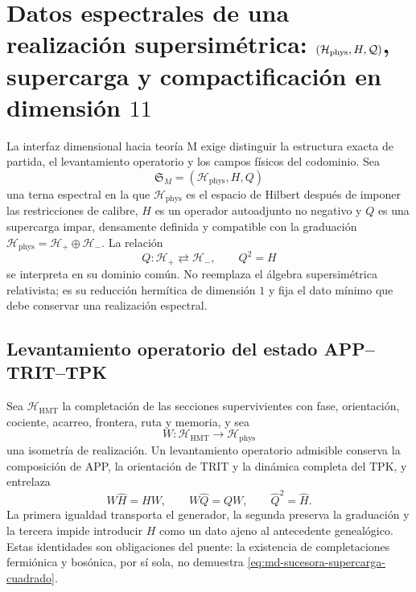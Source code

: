 \section{Datos espectrales de una realización supersimétrica: \((\mathcal H_{\rm phys},H,\mathcal Q)\), supercarga y compactificación en dimensión \(11\)}
\label{sec:md-sucesora-terna-supercarga-m}

La interfaz dimensional hacia teoría M exige distinguir la estructura exacta
de partida, el levantamiento operatorio y los campos físicos del codominio. Sea
\[
 \mathfrak S_M=(\mathcal H_{\mathrm{phys}},H,Q)
\]
una terna espectral en la que \(\mathcal H_{\mathrm{phys}}\) es el espacio de
Hilbert después de imponer las restricciones de calibre, \(H\) es un operador
autoadjunto no negativo y \(Q\) es una supercarga impar, densamente definida y
compatible con la graduación
\(\mathcal H_{\mathrm{phys}}=\mathcal H_+\oplus\mathcal H_-\). La relación
\begin{equation}
 Q:\mathcal H_+\rightleftarrows\mathcal H_-,
 \qquad
 Q^2=H
 \label{eq:md-sucesora-supercarga-cuadrado}
\end{equation}
se interpreta en su dominio común. No reemplaza el álgebra supersimétrica
relativista; es su reducción hermítica de dimensión \(1\) y fija el dato mínimo
que debe conservar una realización espectral.

\subsection{Levantamiento operatorio del estado APP--TRIT--TPK}

Sea \(\mathcal H_{\mathrm{HMT}}\) la completación de las secciones
supervivientes con fase, orientación, cociente, acarreo, frontera, ruta y
memoria, y sea
\[
 W:\mathcal H_{\mathrm{HMT}}\longrightarrow\mathcal H_{\mathrm{phys}}
\]
una isometría de realización. Un levantamiento operatorio admisible conserva
la composición de APP, la orientación de TRIT y la dinámica completa del TPK,
y entrelaza
\begin{equation}
 W\widehat H=HW,
 \qquad
 W\widehat Q=QW,
 \qquad
 \widehat Q^{2}=\widehat H.
 \label{eq:md-sucesora-lift-app-supercarga}
\end{equation}
La primera igualdad transporta el generador, la segunda preserva la graduación
y la tercera impide introducir \(H\) como un dato ajeno al antecedente
genealógico. Estas identidades son obligaciones del puente: la existencia de
completaciones fermiónica y bosónica, por sí sola, no demuestra
\eqref{eq:md-sucesora-supercarga-cuadrado}.

